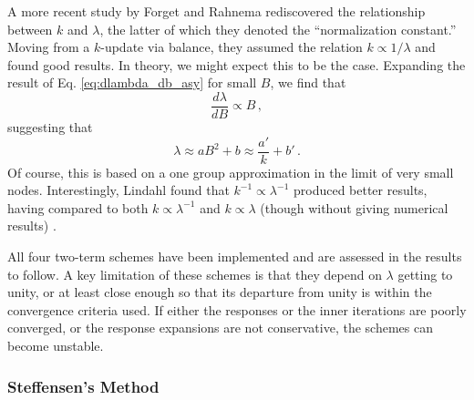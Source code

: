A more recent study by Forget and Rahnema \cite{forget2005nee} 
rediscovered the relationship
between $k$ and $\lambda$, the latter of which they denoted
the ``normalization constant.'' 
Moving from a $k$-update via balance, they assumed the relation 
$k \propto 1/\lambda$ and found good results.  In theory, we might expect 
this to be the case.  Expanding the result of Eq. \ref{eq:dlambda_db_asy}
for small $B$, we find that 
\begin{equation}
 \frac{d \lambda}{d B} \propto  B \, ,
\end{equation}
suggesting that 
\begin{equation}
 \lambda \approx  a B^2 + b \approx \frac{a'}{k} + b' \, .
\end{equation}
Of course, this is based on a one group approximation in the limit of 
very small nodes. Interestingly, Lindahl
found that $k^{-1} \propto \lambda^{-1}$ produced better results, having 
compared to both $k \propto \lambda^{-1}$ and $k \propto \lambda$ (though
without giving numerical results) \cite{lindahl1976mdr}.

All four two-term schemes have been implemented and are assessed in 
the results to follow.  A key limitation of these schemes is that they 
depend on $\lambda$ getting to unity, or at least close enough so that
its departure from unity is within the convergence criteria used.  If
either the responses or the inner iterations are poorly converged, or
the response expansions are not conservative, the 
schemes can become unstable.


\subsubsection{Steffensen's Method}
\label{sec:steffensensmethod}


